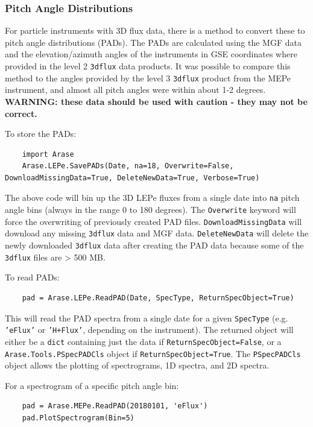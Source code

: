 	\subsubsection{Pitch Angle Distributions}
	
	For particle instruments with 3D flux data, there is a method to convert these to pitch angle distributions (PADs). The PADs are calculated using the MGF data and the elevation/azimuth angles of the instruments in GSE coordinates where provided in the level 2 \texttt{3dflux} data products. It was possible to compare this method to the angles provided by the level 3 \texttt{3dflux} product from the MEPe instrument, and almost all pitch angles were within about 1-2 degrees. \textbf{WARNING: these data should be used with caution - they may not be correct.}
	
	To store the PADs:
	\begin{verbatim}
	import Arase
	Arase.LEPe.SavePADs(Date, na=18, Overwrite=False, DownloadMissingData=True, DeleteNewData=True, Verbose=True)
	\end{verbatim}
	
	The above code will bin up the 3D LEPe fluxes from a single date into \texttt{na} pitch angle bins (always in the range 0 to 180 degrees). The \texttt{Overwrite} keyword will force the overwriting of previously created PAD files. \texttt{DownloadMissingData} will download any missing \texttt{3dflux} data and MGF data. \texttt{DeleteNewData} will delete the newly downloaded \texttt{3dflux} data after creating the PAD data because some of the \texttt{3dflux} files are > 500 MB.
	
	To read PADs:
	\begin{verbatim}
	pad = Arase.LEPe.ReadPAD(Date, SpecType, ReturnSpecObject=True)
	\end{verbatim}
	
	This will read the PAD spectra from a single date for a given \texttt{SpecType} (e.g. \texttt{'eFlux'} or \texttt{'H+Flux'}, depending on the instrument). The returned object will either be a \texttt{dict} containing just the data if \texttt{ReturnSpecObject=False}, or a \texttt{Arase.Tools.PSpecPADCls} object if \texttt{ReturnSpecObject=True}. The \texttt{PSpecPADCls} object allows the plotting of spectrograms, 1D spectra, and 2D spectra.
	
	For a spectrogram of a specific pitch angle bin:
	\begin{verbatim}
	pad = Arase.MEPe.ReadPAD(20180101, 'eFlux')
	pad.PlotSpectrogram(Bin=5)
	\end{verbatim}
	
